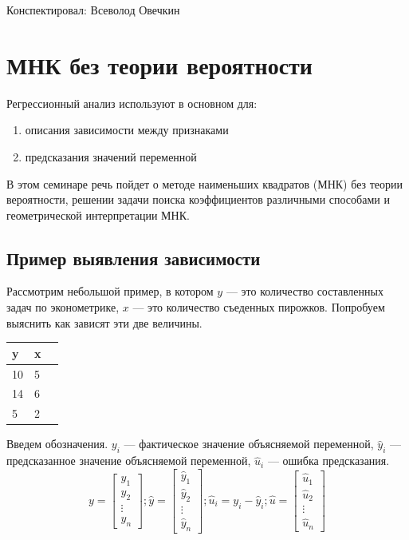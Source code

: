 \documentclass[12pt]{article} %
\theoremstyle{definition} %
\def \hy{\hat{y}}
\def \hu{\hat{u}}
\begin{document}
Конспектировал: Всеволод Овечкин
\section{МНК без теории вероятности}

Регрессионный анализ используют в основном для:
\begin{enumerate}
    \item описания зависимости между признаками
    \item предсказания значений переменной
\end{enumerate}

В этом семинаре речь пойдет о методе наименьших квадратов (МНК) без теории вероятности, решении задачи поиска коэффициентов различными способами и геометрической интерпретации МНК.

\subsection{Пример выявления зависимости}

Рассмотрим небольшой пример, в котором $y$ — это количество составленных задач по эконометрике, $x$ — это количество съеденных пирожков. Попробуем выяснить как зависят эти две величины.

\begin{center}
\begin{tabular}{lll}
\toprule
y & x \\
\midrule
10 & 5 \\
14 & 6 \\
5 & 2 \\
\bottomrule
\end{tabular}
\end{center}

Введем обозначения. $y_i$ — фактическое значение объясняемой переменной, $\hy_i$ — предсказанное значение объясняемой переменной, $\hu_i$ — ошибка предсказания.
\[
y = \begin{bmatrix}
           y_{1} \\
           y_{2} \\
           \vdots \\
           y_{n}
         \end{bmatrix};
\hy = \begin{bmatrix}
           \hy_{1} \\
           \hy_{2} \\
           \vdots \\
           \hy_{n}
         \end{bmatrix};
\hu_i = y_i - \hy_i;
\hu = \begin{bmatrix}
           \hu_{1} \\
           \hu_{2} \\
           \vdots \\
           \hu_{n}
         \end{bmatrix}
\]
\end{document}
